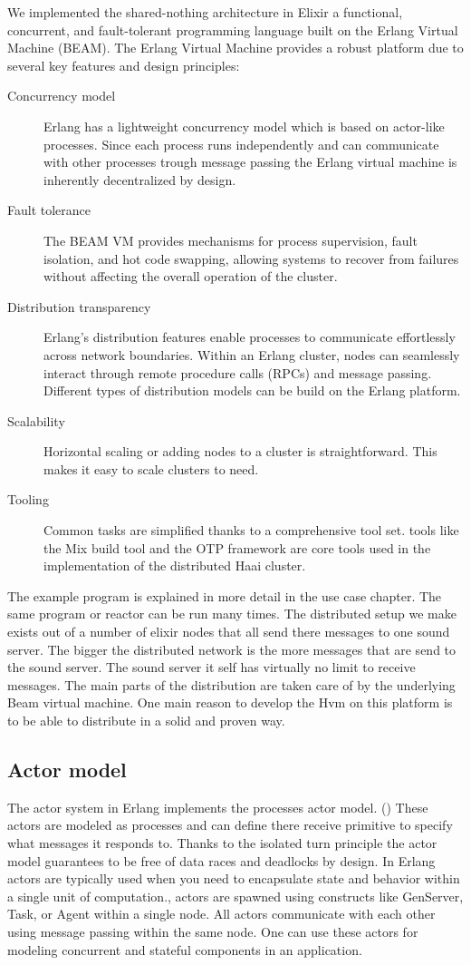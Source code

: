 \documentclass[a4paper]{book}
\begin{document}
We implemented the shared-nothing architecture in Elixir a functional, concurrent, and fault-tolerant programming language built on the Erlang Virtual Machine (BEAM). The Erlang Virtual Machine provides a robust platform due to several key features and design principles:
\begin{description}
	\item[Concurrency model] Erlang has a lightweight concurrency model which is based on actor-like processes. Since each process runs independently and can communicate with other processes trough message passing the Erlang virtual machine is inherently decentralized by design.
	\item[Fault tolerance] The BEAM VM provides mechanisms for process supervision, fault isolation, and hot code swapping, allowing systems to recover from failures without affecting the overall operation of the cluster.
	\item[Distribution transparency] Erlang's distribution features enable processes to communicate effortlessly across network boundaries. Within an Erlang cluster, nodes can seamlessly interact through remote procedure calls (RPCs) and message passing. Different types of distribution models can be build on the Erlang platform.
	\item[Scalability] Horizontal scaling or adding nodes to a cluster is straightforward. This makes it easy to scale clusters to need.
	\item[Tooling] Common tasks are simplified thanks to a comprehensive tool set. tools like the Mix build tool and the OTP framework are core tools used in the implementation of the distributed Haai cluster.
\end{description}

The example program is explained in more detail in the use case chapter. The same program or reactor can be run many times. The distributed setup we make exists out of a number of elixir nodes that all send there messages to one sound server. The bigger the distributed network is the more messages that are send to the sound server. The sound server it self has virtually no limit to receive messages. The main parts of the distribution are taken care of by the underlying Beam virtual machine. One main reason to develop the Hvm on this platform is to be able to distribute in a solid and proven way.  

\subsection{Actor model}
The actor system in Erlang implements the processes actor model. (\cite{de_koster_43_2016}) These actors are modeled as processes and can define there receive primitive to specify what messages it responds to. Thanks to the isolated turn principle the actor model guarantees to be free of data races and deadlocks by design.
In Erlang actors are typically used when you need to encapsulate state and behavior within a single unit of computation., actors are spawned using constructs like GenServer, Task, or Agent within a single node. All actors communicate with each other using message passing within the same node. One can use these actors for modeling concurrent and stateful components in an application.
\end{document}
